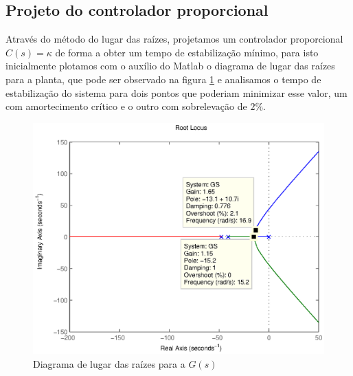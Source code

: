 \documentclass{article}
\begin{document}
\subsection{Projeto do controlador proporcional}
Através do método do lugar das raízes, projetamos um controlador proporcional $C(s) = \kappa$ de forma a obter um tempo de estabilização mínimo, para isto inicialmente plotamos com o auxílio do Matlab o diagrama de lugar das raízes para a planta, que pode ser observado na figura \ref{fig:rlocusgs} e analisamos o tempo de estabilização do sistema para dois pontos que poderiam minimizar esse valor, um com amortecimento crítico e o outro com sobrelevação de $2\%$. 
\begin{figure}[H]
\centering
\includegraphics[width=\linewidth]{rlocusgs}
\caption{Diagrama de lugar das raízes para a $G(s)$}
\label{fig:rlocusgs}
\end{figure}
 
\end{document}
